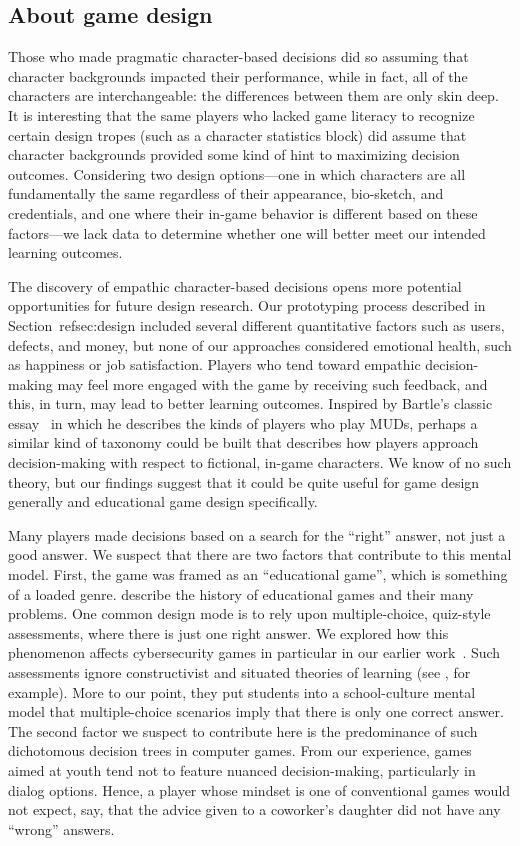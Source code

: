 \documentclass[letterpaper]{article}
\begin{document}
\subsection{About game design}

Those who made pragmatic character-based decisions did so assuming
that character backgrounds impacted their performance, while in fact,
all of the characters are interchangeable: the differences between
them are only skin deep. 
It is interesting that the same players who lacked game literacy to
recognize certain design tropes (such as a character statistics block)
did assume that character backgrounds provided some kind of hint to
maximizing decision outcomes.
Considering two design options---one in which characters are all fundamentally
the same regardless of their appearance, bio-sketch, and credentials, and one where their in-game behavior is different based on these factors---we lack data
to determine whether one will better meet our intended learning outcomes.

The discovery of empathic character-based decisions opens more
potential opportunities for future design research.
Our prototyping process described in Section~ref{sec:design} included
several different quantitative factors such as users, defects, and money,
but none of our approaches considered emotional health, such as happiness
or job satisfaction. Players who tend toward empathic decision-making
may feel more engaged with the game by receiving such feedback, and this,
in turn, may lead to better learning outcomes.
Inspired by Bartle's classic essay~\citep{Bartle1996} in which he
describes the kinds of players who play MUDs, perhaps a similar
kind of taxonomy could be built that describes how players approach
decision-making with respect to fictional, in-game characters.
We know of no such theory, but our findings suggest that it could be
quite useful for game design generally and educational game design
specifically.

Many players made decisions based on a search for the ``right'' answer,
not just a good answer. We suspect that there are two factors
that contribute to this mental model. First, the game was framed as
an ``educational game'', which is something of a loaded genre.
\citet{Klopfer2009} describe the history of educational games and their
many problems. One common design mode is to rely upon multiple-choice,
quiz-style assessments, where there is just one right answer.
We explored how this phenomenon affects cybersecurity games in particular
in our earlier work~\citep{Gestwicki2015}. 
Such assessments ignore constructivist
and situated theories of learning (see \citet{Hickey2003}, for example).
More to our point, they put students into a school-culture mental model
that multiple-choice scenarios imply that there is only one correct
answer.
The second factor we suspect to contribute here is the predominance
of such dichotomous decision trees in computer games. From our experience,
games aimed at youth tend not to feature nuanced decision-making, particularly
in dialog options. Hence, a player whose mindset is one of conventional
games would not expect, say, that the advice given to a coworker's
daughter did not have any ``wrong'' answers.
\end{document}
